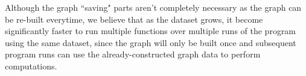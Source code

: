 \documentclass[12pt]{article}
\begin{document}
Although the graph ``saving" parts aren't completely necessary as the graph can be re-built everytime, we believe that as the dataset grows, it become significantly faster to run multiple functions over multiple runs of the program using the same dataset, since the graph will only be built once and subsequent program runs can use the already-constructed graph data to perform computations. 
\end{document}
